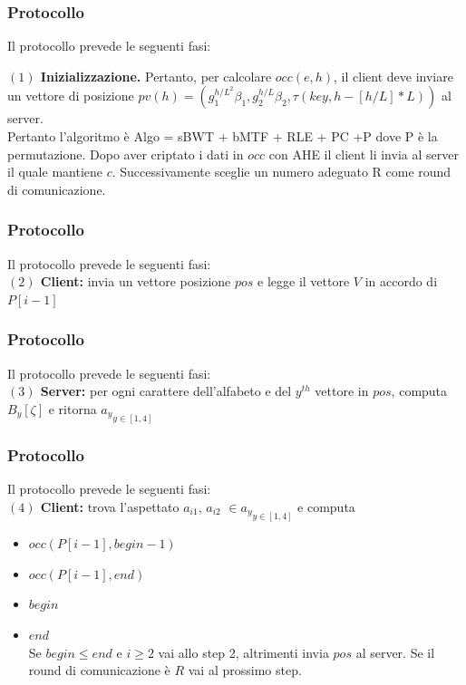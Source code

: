 \documentclass{beamer}
\begin{document}
\begin{frame}
\frametitle{Protocollo}
Il protocollo prevede le seguenti fasi:

\textbf{$(1)$ Inizializzazione.}
Pertanto, per calcolare $occ(e, h)$, il client deve inviare un vettore di posizione $pv(h) = (g_{1}^{h/L^{2}} \beta_{1}, g_{2}^{h/L} \beta_{2}, \tau(key, h-[h/L] * L) )$ al server.\\ 

Pertanto l'algoritmo è Algo = sBWT + bMTF + RLE + PC +P dove P è la permutazione. Dopo aver criptato i dati in $occ$ con AHE il client li invia al server il quale mantiene $c$. Successivamente sceglie un numero adeguato R come round di comunicazione.
\end{frame}

\begin{frame}
\frametitle{Protocollo}
Il protocollo prevede le seguenti fasi:\\
\textbf{$(2)$ Client:} invia un vettore posizione $pos$ e legge il vettore $V$ in accordo di $P[i-1]$
\end{frame}

\begin{frame}
\frametitle{Protocollo}
Il protocollo prevede le seguenti fasi:\\
\textbf{$(3)$ Server:} per ogni carattere dell'alfabeto e del $y^{th}$ vettore in $pos$, computa $B_{y}[\zeta]$ e ritorna ${a_{y}}_{y\in[1,4]}$
\end{frame}

\begin{frame}
\frametitle{Protocollo}
Il protocollo prevede le seguenti fasi:\\
\textbf{$(4)$ Client:} trova l'aspettato $a_{i1}$, $a_{i2}$ $\in {a_{y}}_{y\in[1,4]} $ e computa
\begin{itemize}
\item $occ(P[i-1], begin-1)$
\item $occ(P[i-1], end)$
\item $begin$
\item $end$
\\	Se $begin \leq end$ e $i \geq 2 $ vai allo step 2, altrimenti invia $pos$ al server. Se il round di comunicazione è $R$ vai al prossimo step.
\end{itemize}
\end{frame}
\end{document}
